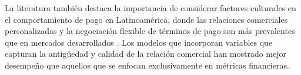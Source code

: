 La literatura también destaca la importancia de considerar factores culturales en el comportamiento de pago en Latinoamérica, donde las relaciones comerciales personalizadas y la negociación flexible de términos de pago son más prevalentes que en mercados desarrollados \cite{pena2021credit}. Los modelos que incorporan variables que capturan la antigüedad y calidad de la relación comercial han mostrado mejor desempeño que aquellos que se enfocan exclusivamente en métricas financieras.